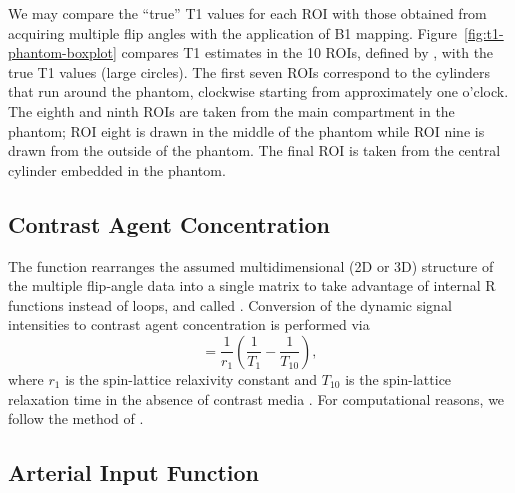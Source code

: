 We may compare the ``true'' T1 values for each ROI with those obtained
from acquiring multiple flip angles with the application of B1
mapping.  Figure~\ref{fig:t1-phantom-boxplot} compares T1 estimates in
the 10 ROIs, defined by , with the true T1 values (large
circles).  The first seven ROIs correspond to the cylinders that run
around the phantom, clockwise starting from approximately one o'clock.
The eighth and ninth ROIs are taken from the main compartment in the
phantom; ROI eight is drawn in the middle of the phantom while ROI
nine is drawn from the outside of the phantom.  The final ROI is taken
from the central cylinder embedded in the phantom.

\subsection{Contrast Agent Concentration}

The  function rearranges the assumed multidimensional
(2D or 3D) structure of the multiple flip-angle data into a single
matrix to take advantage of internal R functions instead of loops, and
called .  Conversion of the dynamic signal intensities to
contrast agent concentration is performed via
\begin{equation*}
  [\text{Gd}] = \frac{1}{r_1}\left(\frac{1}{T_1} - \frac{1}{T_{10}}\right),
\end{equation*}
where $r_1$ is the spin-lattice relaxivity constant and $T_{10}$ is
the spin-lattice relaxation time in the absence of contrast media
\citep{buc-par:measuring}.  For computational reasons, we follow the
method of \cite{li-etal:improved}.

\subsection{Arterial Input Function}

